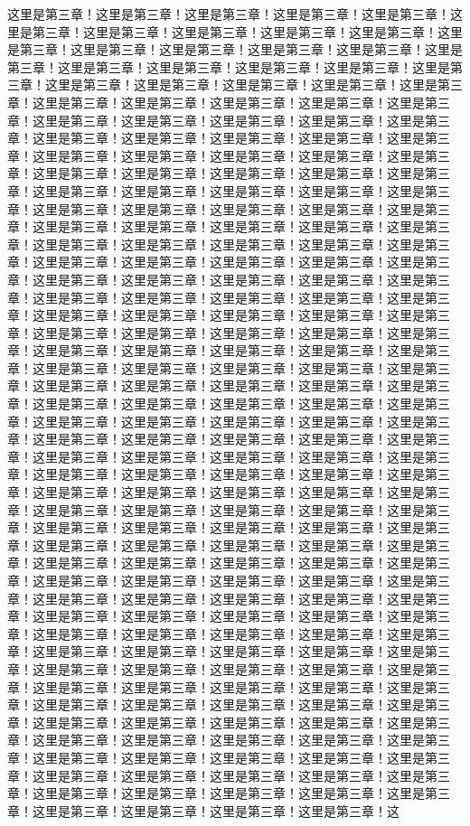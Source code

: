 
\label{sec3}
这里是第三章！这里是第三章！这里是第三章！这里是第三章！这里是第三章！这里是第三章！这里是第三章！这里是第三章！这里是第三章！这里是第三章！这里是第三章！这里是第三章！这里是第三章！这里是第三章！这里是第三章！这里是第三章！这里是第三章！这里是第三章！这里是第三章！这里是第三章！这里是第三章！这里是第三章！这里是第三章！这里是第三章！这里是第三章！这里是第三章！这里是第三章！这里是第三章！这里是第三章！这里是第三章！这里是第三章！这里是第三章！这里是第三章！这里是第三章！这里是第三章！这里是第三章！这里是第三章！这里是第三章！这里是第三章！这里是第三章！这里是第三章！这里是第三章！这里是第三章！这里是第三章！这里是第三章！这里是第三章！这里是第三章！这里是第三章！这里是第三章！这里是第三章！这里是第三章！这里是第三章！这里是第三章！这里是第三章！这里是第三章！这里是第三章！这里是第三章！这里是第三章！这里是第三章！这里是第三章！这里是第三章！这里是第三章！这里是第三章！这里是第三章！这里是第三章！这里是第三章！这里是第三章！这里是第三章！这里是第三章！这里是第三章！这里是第三章！这里是第三章！这里是第三章！这里是第三章！这里是第三章！这里是第三章！这里是第三章！这里是第三章！这里是第三章！这里是第三章！这里是第三章！这里是第三章！这里是第三章！这里是第三章！这里是第三章！这里是第三章！这里是第三章！这里是第三章！这里是第三章！这里是第三章！这里是第三章！这里是第三章！这里是第三章！这里是第三章！这里是第三章！这里是第三章！这里是第三章！这里是第三章！这里是第三章！这里是第三章！这里是第三章！这里是第三章！这里是第三章！这里是第三章！这里是第三章！这里是第三章！这里是第三章！这里是第三章！这里是第三章！这里是第三章！这里是第三章！这里是第三章！这里是第三章！这里是第三章！这里是第三章！这里是第三章！这里是第三章！这里是第三章！这里是第三章！这里是第三章！这里是第三章！这里是第三章！这里是第三章！这里是第三章！这里是第三章！这里是第三章！这里是第三章！这里是第三章！这里是第三章！这里是第三章！这里是第三章！这里是第三章！这里是第三章！这里是第三章！这里是第三章！这里是第三章！这里是第三章！这里是第三章！这里是第三章！这里是第三章！这里是第三章！这里是第三章！这里是第三章！这里是第三章！这里是第三章！这里是第三章！这里是第三章！这里是第三章！这里是第三章！这里是第三章！这里是第三章！这里是第三章！这里是第三章！这里是第三章！这里是第三章！这里是第三章！这里是第三章！这里是第三章！这里是第三章！这里是第三章！这里是第三章！这里是第三章！这里是第三章！这里是第三章！这里是第三章！这里是第三章！这里是第三章！这里是第三章！这里是第三章！这里是第三章！这里是第三章！这里是第三章！这里是第三章！这里是第三章！这里是第三章！这里是第三章！这里是第三章！这里是第三章！这里是第三章！这里是第三章！这里是第三章！这里是第三章！这里是第三章！这里是第三章！这里是第三章！这里是第三章！这里是第三章！这里是第三章！这里是第三章！这里是第三章！这里是第三章！这里是第三章！这里是第三章！这里是第三章！这里是第三章！这里是第三章！这里是第三章！这里是第三章！这里是第三章！这里是第三章！这里是第三章！这里是第三章！这里是第三章！这里是第三章！这里是第三章！这里是第三章！这里是第三章！这里是第三章！这里是第三章！这里是第三章！这里是第三章！这里是第三章！这里是第三章！这里是第三章！这里是第三章！这里是第三章！这里是第三章！这里是第三章！这里是第三章！这里是第三章！这里是第三章！这里是第三章！这里是第三章！这里是第三章！这里是第三章！这里是第三章！这里是第三章！这里是第三章！这里是第三章！这里是第三章！这